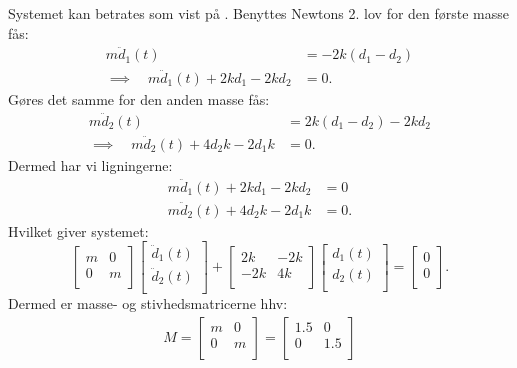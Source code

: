 \begin{derivation}
  Systemet kan betrates som vist på .
  Benyttes Newtons 2. lov for den første masse fås:
  \begin{align*}
    m \ddot{d}_1(t) &= - 2k (d_1 - d_2) \\
    \implies \quad m \ddot{d}_1 (t) + 2k d_1 - 2k d_2 &= 0
  .\end{align*}
  Gøres det samme for den anden masse fås:
  \begin{align*}
    m \ddot{d}_2(t) &= 2k \left( d_1 - d_2 \right) - 2k d_2 \\
    \implies \quad m \ddot{d}_2 (t) + 4 d_2 k - 2 d_1 k &= 0
  .\end{align*}
  Dermed har vi ligningerne:
  \begin{align*}
    m \ddot{d}_1 (t) + 2k d_1 -  2k d_2 &= 0 \\
    m \ddot{d}_2(t) + 4 d_2 k - 2 d_1 k &= 0
  .\end{align*}
  Hvilket giver systemet:
  \[ 
  \begin{bmatrix}
  m & 0\\
  0 & m\\
  \end{bmatrix} \begin{bmatrix}
  \ddot{d}_1 (t)\\
  \ddot{d}_2(t)\\
  \end{bmatrix} + \begin{bmatrix}
  2k & - 2k\\
  - 2k & 4k \\
  \end{bmatrix} \begin{bmatrix}
  d_1(t)\\
  d_2(t)\\
  \end{bmatrix} = \begin{bmatrix}
  0\\
  0\\
  \end{bmatrix}
  .\]
  Dermed er masse- og stivhedsmatricerne hhv:
  \begin{gather*}
    M = \begin{bmatrix}
    m & 0\\
    0 & m\\
    \end{bmatrix} = \begin{bmatrix}
    \num{1,5} & 0\\
    0 & \num{1,5} \\

\end{bmatrix}
\end{gather*}
\end{derivation}
